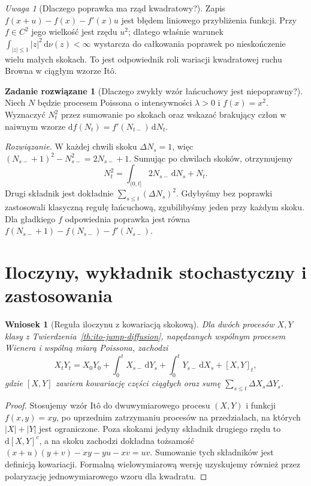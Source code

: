 \documentclass[11pt,a4paper,oneside]{report}
\numberwithin{equation}{chapter}
\theoremstyle{plain}
\newtheorem{wniosek}[twierdzenie]{Wniosek}
\theoremstyle{definition}
\newtheorem{zadanie}{Zadanie rozwiązane}[chapter]
\theoremstyle{remark}
\newtheorem{uwaga}{Uwaga}[chapter]
\newcommand{\dd}{\mathrm{d}}
\begin{document}
\begin{uwaga}[Dlaczego poprawka ma rząd kwadratowy?]
Zapis $f(x+u)-f(x)-f'(x)u$ jest błędem liniowego
przybliżenia funkcji. Przy $f\in C^2$ jego wielkość jest
rzędu $u^2$; dlatego właśnie warunek
$\int_{|z|\le1}|z|^2\,\dd\nu(z)<\infty$
wystarcza do całkowania poprawek po nieskończenie wielu
małych skokach. To jest odpowiednik roli wariacji
kwadratowej ruchu Browna w ciągłym wzorze Itô.
\end{uwaga}

\begin{zadanie}[Dlaczego zwykły wzór łańcuchowy jest niepoprawny?]
Niech $N$ będzie procesem Poissona o intensywności
$\lambda>0$ i $f(x)=x^2$. Wyznaczyć $N_t^2$ przez
sumowanie po skokach oraz wskazać brakujący człon
w naiwnym wzorze $\dd f(N_t)=f'(N_{t-})\,\dd N_t$.

\emph{Rozwiązanie.} W każdej chwili skoku $\Delta N_s=1$,
więc $(N_{s-}+1)^2-N_{s-}^2=2N_{s-}+1$.
Sumując po chwilach skoków, otrzymujemy
\[
N_t^2=\int_{(0,t]}2N_{s-}\,\dd N_s+N_t.
\]
Drugi składnik jest dokładnie
$\sum_{s\le t}(\Delta N_s)^2$.
Gdybyśmy bez poprawki zastosowali klasyczną
regułę łańcuchową, zgubilibyśmy jeden przy każdym skoku.
Dla gładkiego $f$ odpowiednia poprawka jest równa
$f(N_{s-}+1)-f(N_{s-})-f'(N_{s-})$.
\end{zadanie}

\section{Iloczyny, wykładnik stochastyczny i zastosowania}

\begin{wniosek}[Reguła iloczynu z kowariacją skokową]
\label{cor:jump-product}
Dla dwóch procesów $X,Y$ klasy z
Twierdzenia~\ref{th:ito-jump-diffusion}, napędzanych
wspólnym procesem Wienera i wspólną miarą Poissona,
zachodzi
\[
X_tY_t=X_0Y_0+\int_0^tX_{s-}\,\dd Y_s
+\int_0^tY_{s-}\,\dd X_s+[X,Y]_t,
\]
gdzie $[X,Y]$ zawiera kowariację części ciągłych
oraz sumę $\sum_{s\le t}\Delta X_s\Delta Y_s$.
\end{wniosek}
\begin{proof}
Stosujemy wzór Itô do dwuwymiarowego procesu
$(X,Y)$ i funkcji $f(x,y)=xy$, po uprzednim zatrzymaniu
procesów na przedziałach, na których $|X|+|Y|$ jest
ograniczone. Poza skokami jedyny składnik drugiego
rzędu to $\dd[X,Y]^c$, a na skoku zachodzi dokładna
tożsamość
$(x+u)(y+v)-xy-yu-xv=uv$.
Sumowanie tych składników jest definicją kowariacji.
Formalną wielowymiarową wersję uzyskujemy również
przez polaryzację jednowymiarowego wzoru dla kwadratu.
\end{proof}
\end{document}
